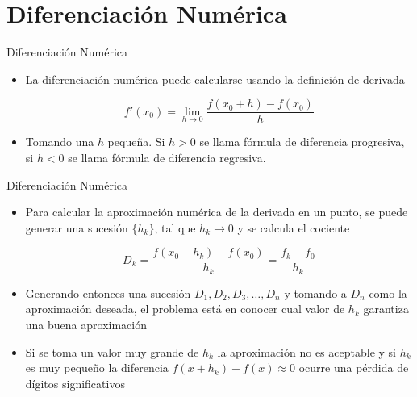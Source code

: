 \documentclass[12pt]{beamer}
\begin{document}
\section{Diferenciaci\'on Num\'erica}
\begin{frame}{Diferenciaci\'on Num\'erica}
    \begin{itemize}
        \item<1-> La diferenciaci\'on num\'erica puede calcularse usando la definici\'on de derivada
        \begin{block}{}
          $$
          f'(x_0) = \lim_{h\rightarrow0}\frac{f(x_0+h)-f(x_0)}{h}
          $$
        \end{block}
        \item<2-> Tomando una $h$ peque\~na. Si $h > 0$ se llama f\'ormula de diferencia progresiva, si $h < 0$ se llama f\'ormula de diferencia regresiva.
    \end{itemize}
\end{frame}
\begin{frame}{Diferenciaci\'on Num\'erica}
  \begin{itemize}
    \item Para calcular la aproximaci\'on num\'erica de la derivada en un punto, se puede generar una sucesi\'on $\{h_k\}$, tal que $h_k \to 0$ y se calcula el cociente
    \begin{block}{}
      $$
      D_k = \dfrac{f(x_0+h_k)-f(x_0)}{h_k} = \dfrac{f_k-f_0}{h_k}
      $$
    \end{block}
    \item<2-> Generando entonces una sucesi\'on $D_1, D_2, D_3,\ldots, D_n$ y tomando a $D_n$ como la aproximaci\'on deseada, el problema est\'a en conocer cual valor de $h_k$ garantiza una buena aproximaci\'on
    \item Si se toma un valor muy grande de $h_k$ la aproximaci\'on no es aceptable y si $h_k$ es muy peque\~no la diferencia $f(x + h_k) - f(x) \approx 0$ ocurre una p\'erdida de d\'igitos significativos
  \end{itemize}
\end{frame}
\end{document}
